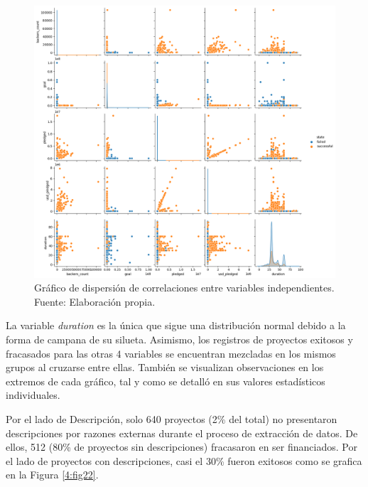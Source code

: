 \begin{figure}[!ht]
	\begin{center}
		\includegraphics[width=1.00\textwidth]{4/figures/metadata cor-plot2.png}
		\caption[Gráfico de dispersión de correlaciones entre variables independientes]{Gráfico de dispersión de correlaciones entre variables independientes.\\
			Fuente: Elaboración propia.}
		\label{4:fig21}
	\end{center}
\end{figure}

La variable \textit{duration} es la única que sigue una distribución normal debido a la forma de campana de su silueta. Asimismo, los registros de proyectos exitosos y fracasados para las otras 4 variables se encuentran mezcladas en los mismos grupos al cruzarse entre ellas. También se visualizan observaciones en los extremos de cada gráfico, tal y como se detalló en sus valores estadísticos individuales.

\newpage
Por el lado de Descripción, solo 640 proyectos (2\% del total) no presentaron descripciones por razones externas durante el proceso de extracción de datos. De ellos, 512 (80\% de proyectos sin descripciones) fracasaron en ser financiados. Por el lado de proyectos con descripciones, casi el 30\% fueron exitosos como se grafica en la Figura \ref{4:fig22}.

